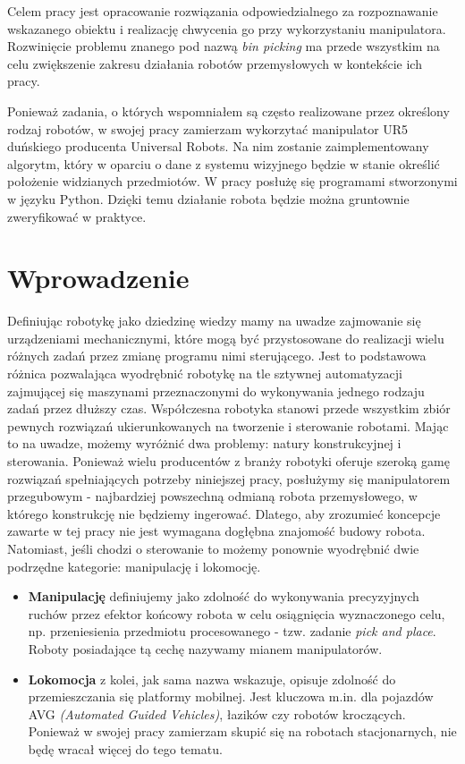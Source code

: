 \documentclass[12pt]{article}
\begin{document}
Celem pracy jest opracowanie rozwiązania odpowiedzialnego za rozpoznawanie wskazanego obiektu i realizację chwycenia go przy wykorzystaniu manipulatora. Rozwinięcie problemu znanego pod nazwą \emph{bin picking} ma przede wszystkim na celu zwiększenie zakresu działania robotów przemysłowych w kontekście ich pracy.

Ponieważ zadania, o których wspomniałem są często realizowane przez określony rodzaj robotów, w swojej pracy zamierzam wykorzytać manipulator UR5 duńskiego producenta Universal Robots. Na nim zostanie zaimplementowany algorytm, który w oparciu o dane z systemu wizyjnego będzie w stanie określić położenie widzianych przedmiotów. W pracy posłużę się programami stworzonymi w języku Python. Dzięki temu działanie robota będzie można gruntownie zweryfikować w praktyce.

\newpage
\tableofcontents

\newpage
\section{Wprowadzenie}
Definiując robotykę jako dziedzinę wiedzy mamy na uwadze zajmowanie się urządzeniami mechanicznymi, które mogą być przystosowane do realizacji wielu różnych zadań przez zmianę programu nimi sterującego. Jest to podstawowa różnica pozwalająca wyodrębnić robotykę na tle sztywnej automatyzacji zajmującej się maszynami przeznaczonymi do wykonywania jednego rodzaju zadań przez dłuższy czas. Współczesna robotyka stanowi przede wszystkim zbiór pewnych rozwiązań ukierunkowanych na tworzenie i sterowanie robotami. Mając to na uwadze, możemy wyróżnić dwa problemy: natury konstrukcyjnej i sterowania. Ponieważ wielu producentów z branży robotyki oferuje szeroką gamę rozwiązań spełniających potrzeby niniejszej pracy, posłużymy się manipulatorem przegubowym - najbardziej powszechną odmianą robota przemysłowego, w którego konstrukcję nie będziemy ingerować. Dlatego, aby zrozumieć koncepcje zawarte w tej pracy nie jest wymagana dogłębna znajomość budowy robota. Natomiast, jeśli chodzi o sterowanie to możemy ponownie wyodrębnić dwie podrzędne kategorie: manipulację i lokomocję. 

\begin{itemize}
\item \textbf{Manipulację} definiujemy jako zdolność do wykonywania precyzyjnych ruchów przez efektor końcowy robota w celu osiągnięcia wyznaczonego celu, np. przeniesienia przedmiotu procesowanego - tzw. zadanie \emph{pick and place}. Roboty posiadające tą cechę nazywamy mianem manipulatorów.

\item \textbf{Lokomocja} z kolei, jak sama nazwa wskazuje, opisuje zdolność do przemieszczania się platformy mobilnej. Jest kluczowa m.in. dla pojazdów AVG \emph{(Automated Guided Vehicles)}, łazików czy robotów kroczących. Ponieważ w swojej pracy zamierzam skupić się na robotach stacjonarnych, nie będę wracał więcej do tego tematu.
\end{itemize}
\end{document}
